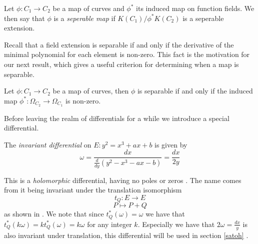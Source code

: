 \begin{mydef} 
 Let $\phi: C_1 \rightarrow C_2$ be a map of curves and $\phi^*$ its induced map on
function fields. We then say that $\phi$ is a \emph{seperable map} if
$K(C_1)/\phi^* K(C_2)$ is a seperable extension.
\end{mydef}

Recall that a field extension is separable if and only if the derivative of the minimal
polynomial for each element is non-zero. This fact is the motivation for our next result,
which gives a useful criterion for determining when a map is separable.

\begin{prop} \label{diffsep}
 Let $\phi: C_1 \rightarrow C_2$ be a map of curves, then $\phi$ is separable if and only if
the induced map $\phi^*: \Omega_{C_2} \rightarrow \Omega_{C_1} $ is non-zero.
\end{prop}

Before leaving the realm of differentials for a while we introduce a special differential.
\begin{mydef}
The \emph{invariant differential} on $E: y^2 = x^3 + ax + b$ is given by
$$\omega = \frac{dx}{\frac{d}{dy}\left(y^2 - x^3  - ax - b\right)} = \frac{dx}{2y} $$
\end{mydef}
This is a \emph{holomorphic} differential, having no poles or zeros \cite{AEC}. The name comes from it
being invariant under the translation isomorphism
$$ t_Q: E \rightarrow E$$
$$ P \mapsto P + Q$$
as shown in \cite{AEC}. We note that since $t_Q^*(\omega) = \omega$ we have that
$t_Q^*(k\omega) = k t_Q^*(\omega) = k\omega$ for any integer $k$. Especially we have that
$2\omega = \frac{dx}{y}$ is also invariant under translation, this differential will be used
in section \ref{satoh} \label{invariant}.

